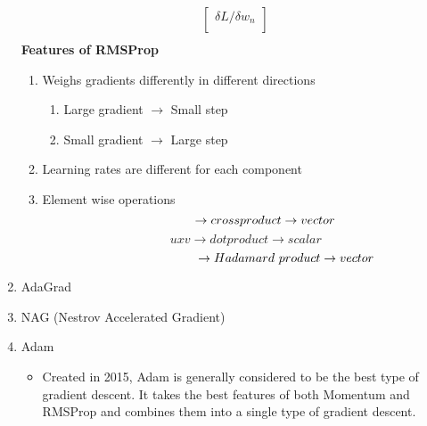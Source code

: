 \begin{enumerate}
\begin{align*}
\begin{bmatrix}
           \delta L/\delta w_n    \\
         \end{bmatrix} \\
    \end{align*}
    \textbf{Features of RMSProp}
    \begin{enumerate}
        \item Weighs gradients differently in different directions
        \begin{enumerate}
            \item Large gradient $\rightarrow$ Small step
            \item Small gradient $\rightarrow$ Large step
        \end{enumerate}
        \item Learning rates are different for each component
        \item Element wise operations
        \[
        \hspace{1.1cm} \rightarrow cross product \rightarrow vector
        \]
        \[
        uxv \rightarrow dot product \rightarrow scalar
        \]
        \[
        \hspace{2.3cm} \rightarrow Hadamard\ product \rightarrow vector
        \]
    \end{enumerate}
    \item AdaGrad
    \item NAG (Nestrov Accelerated Gradient)
    \item Adam
    \begin{itemize}
        \item Created in 2015, Adam is generally considered to be the best type of gradient descent. It takes the best features of both Momentum and RMSProp and combines them into a single type of gradient descent.
    \end{itemize}
\end{enumerate}
